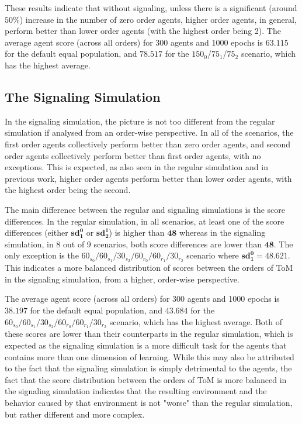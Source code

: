 These results indicate that without signaling, unless there is a significant (around $50\%$) increase in the number of zero order agents, higher order agents, in general, perform better than lower order agents (with the highest order being 2). The average agent score (across all orders) for 300 agents and 1000 epochs is $\mathbf{63.115}$ for the default equal population, and $\mathbf{78.517}$ for the $150_{0}$/$75_{1}$/$75_{2}$ scenario, which has the highest average.

\subsection{The Signaling Simulation}

In the signaling simulation, the picture is not too different from the regular simulation if analysed from an order-wise perspective. In all of the scenarios, the first order agents collectively perform better than zero order agents, and second order agents collectively perform better than first order agents, with no exceptions. This is expected, as also seen in the regular simulation and in previous work, higher order agents perform better than lower order agents, with the highest order being the second.

The main difference between the regular and signaling simulations is the score differences. In the regular simulation, in all scenarios, at least one of the score differences (either $\mathbf{sd^0_1}$ or $\mathbf{sd^1_2}$) is higher than $\mathbf{48}$ whereas in the signaling simulation, in 8 out of 9 scenarios, both score differences are lower than $\mathbf{48}$. The only exception is the $60_{s_{0}}/60_{s_{1}}/30_{s_{2}}/60_{r_{0}}/60_{r_{1}}/30_{r_{2}}$ scenario where $\mathbf{sd^0_1 = 48.621}$. This indicates a more balanced distribution of scores between the orders of ToM in the signaling simulation, from a higher, order-wise perspective.

The average agent score (across all orders) for 300 agents and 1000 epochs is $\mathbf{38.197}$ for the default equal population, and $\mathbf{43.684}$ for the $60_{s_{0}}/60_{s_{1}}/30_{s_{2}}/60_{r_{0}}/60_{r_{1}}/30_{r_{2}}$ scenario, which has the highest average. Both of these scores are lower than their counterparts in the regular simulation, which is expected as the signaling simulation is a more difficult task for the agents that contains more than one dimension of learning. While this may also be attributed to the fact that the signaling simulation is simply detrimental to the agents, the fact that the score distribution between the orders of ToM is more balanced in the signaling simulation indicates that the resulting environment and the behavior caused by that environment is not "worse" than the regular simulation, but rather different and more complex.

